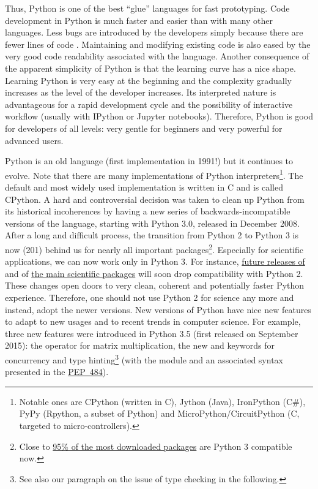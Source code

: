 Thus, Python is one of the best ``glue'' languages for fast prototyping.
Code development in Python is much faster and easier than with many other
languages. Less bugs are introduced by the developers simply because there are
fewer lines of code \citep{nanz_comparative_2015}.
%
Maintaining and modifying existing code is also eased by the very good code
readability associated with the language.
%
Another consequence of the apparent simplicity of Python is that the learning
curve has a nice shape. Learning Python is very easy at the beginning and the
complexity gradually increases as the level of the developer increases.
%
Its interpreted nature is advantageous for a rapid development cycle and the
possibility of interactive workflow (usually with IPython or Jupyter
notebooks).
%
Therefore, Python is good for developers of all levels: very gentle for
beginners and very powerful for advanced users.

Python is an old language (first implementation in 1991!) but it continues to
evolve.
%
Note that there are many implementations of Python
interpreters\footnote{Notable ones are CPython (written in C), Jython (Java),
IronPython (C\#), PyPy (Rpython, a subset of Python) and
MicroPython/CircuitPython (C, targeted to micro-controllers).}. The default and
most widely used implementation is written in C and is called CPython.
%
A hard and controversial decision was taken to clean up Python from its
historical incoherences by having a new series of backwards-incompatible
versions of the language, starting with Python 3.0, released in December 2008.
After a long and difficult process, the transition from Python 2 to Python 3 is
now (201) behind us for nearly all important packages\footnote{Close to
\href{https://python3wos.appspot.com/}{95\% of the most downloaded packages}
are Python 3 compatible now.}. Especially for scientific applications, we can
now work only in Python 3. For instance, \href{https://github.com/%
numpy/numpy/blob/master/doc/neps/dropping-python2.7-proposal.rst}{future
releases of \Numpy} and of \href{http://www.python3statement.org/}{the main
scientific packages} will soon drop compatibility with Python 2. These changes
open doors to very clean, coherent and potentially faster Python
experience. Therefore, one should not use Python 2 for science any more and
instead, adopt the newer versions.
%
New versions of Python have nice new features to adapt to new usages and to
recent trends in computer science.  For example, three new features were
introduced in Python 3.5 (first released on September 2015): the 
operator for matrix multiplication, the new  and
 keywords for concurrency and type hinting\footnote{See also our
paragraph on the issue of type checking in the following.} (with the module
 and an associated syntax presented in the
\href{https://www.python.org/dev/peps/pep-0484/}{PEP~484}).


